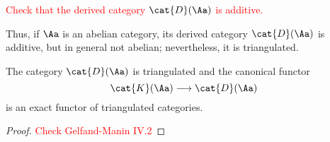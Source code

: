 \begin{exercise}
    \textcolor{red}{Check that the derived category $\cat{D}(\Aa)$
    is additive.}
\end{exercise}

Thus, if $\Aa$ is an abelian category, 
its derived category $\cat{D}(\Aa)$ is additive, 
but in general not abelian;
nevertheless, it is triangulated.

\begin{prop}
    The category $\cat{D}(\Aa)$ is triangulated and the canonical functor
    \begin{equation*}
        \cat{K}(\Aa) \longrightarrow \cat{D}(\Aa)
    \end{equation*}
    is an exact functor of triangulated categories.
    \begin{proof}
        \textcolor{red}{Check Gelfand-Manin IV.2}
    \end{proof}
\end{prop}

